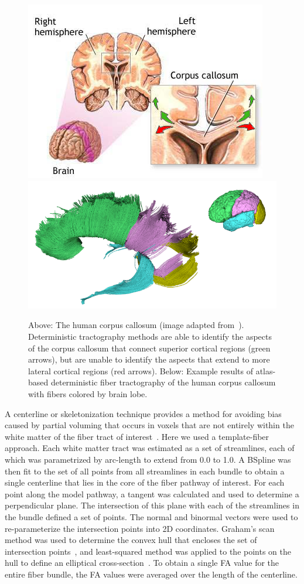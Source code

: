 \begin{figure}
\begin{center}
\includegraphics[width=0.5\linewidth]{figures/corpus_callosum_lateral.png} \\
\includegraphics[width=0.8\linewidth]{figures/ccfibers2.png}
\caption{Above: The human corpus callosum (image adapted from~\cite{medlineplus}). Deterministic tractography methods are able to identify the aspects of the corpus callosum that connect superior cortical regions (green arrows), but are unable to identify the aspects that extend to more lateral cortical regions (red arrows). Below: Example results of atlas-based deterministic fiber tractography of the human corpus callosum with fibers colored by brain lobe. }
\label{fig:callosum}
\end{center}
\end{figure}

A centerline or skeletonization technique provides a method for avoiding bias caused by partial voluming that occurs in voxels that are not entirely within the white matter of the fiber tract of interest~\cite{Smith2006,Yushkevich2008}. Here we used a template-fiber approach. Each white matter tract was estimated as a set of streamlines, each of which was parametrized by arc-length to extend from 0.0 to 1.0. A BSpline was then fit to the set of all points from all streamlines in each bundle to obtain a single centerline that lies in the core of the fiber pathway of interest. For each point along the model pathway, a tangent was calculated and used to determine a perpendicular plane. The intersection of this plane with each of the streamlines in the bundle defined a set of points.  The normal and binormal vectors were used to re-parameterize the intersection points into 2D coordinates. Graham's scan method was used to determine the convex hull that encloses the set of intersection points~\cite{Graham1972}, and least-squared method was applied to the points on the hull to define an elliptical cross-section~\cite{Fitzgibbon1999}. To obtain a single FA value for the entire fiber bundle, the FA values were averaged over the length of the centerline.


